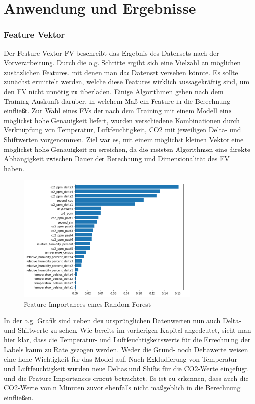 \clearpage
\chapter{\textbf{Anwendung und Ergebnisse}}\label{kap3}

\subsection{Feature Vektor}
Der Feature Vektor FV beschreibt das Ergebnis des Datensets nach der Vorverarbeitung. 
Durch die o.g. Schritte ergibt sich eine Vielzahl an möglichen zusätzlichen Features,
mit denen man das Datenset versehen könnte. Es sollte zunächst ermittelt werden, welche diese Features wirklich 
aussagekräftig sind, um den FV nicht unnötig zu überladen. Einige Algorithmen geben nach dem Training 
Auskunft darüber, in welchem Maß ein Feature in die Berechnung einfließt. Zur Wahl eines FVs der 
nach dem Training mit einem Modell eine möglichst hohe Genauigkeit liefert, wurden verschiedene Kombinationen durch 
Verknüpfung von Temperatur, Luftfeuchtigkeit, CO2 mit jeweiligen Delta- und Shiftwerten vorgenommen. Ziel war es, 
mit einem möglichst kleinen Vektor eine möglichst hohe Genauigkeit zu erreichen, da die meisten Algorithmen eine 
direkte Abhängigkeit zwischen Dauer der Berechnung und Dimensionalität des FV haben.  

\begin{figure}[h]
    \centering
    \includegraphics[width=0.8\textwidth]{pic/feature_importances.png}
    \caption{Feature Importances eines Random Forest}
    \label{fig:FI}
\end{figure}

In der o.g. Grafik sind neben den ursprünglichen Datenwerten nun auch Delta- und Shiftwerte zu sehen. Wie bereits 
im vorherigen Kapitel angedeutet, sieht man hier klar, dass die Temperatur- und Luftfeuchtigkeitswerte für 
die Errechnung der Labels kaum zu Rate gezogen werden. Weder die Grund- noch Deltawerte weisen eine hohe 
Wichtigkeit für das Model auf.
\newpage
Nach Exkludierung von Temperatur und Luftfeuchtigkeit wurden neue Deltas und Shifts für die CO2-Werte eingefügt 
und die Feature Importances erneut betrachtet. Es ist zu erkennen, dass auch die CO2-Werte von n Minuten zuvor 
ebenfalls nicht maßgeblich in die Berechnung einfließen.\\

